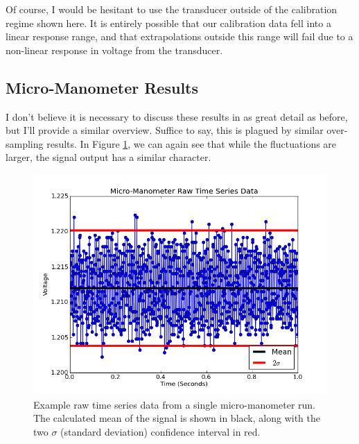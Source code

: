\documentclass{article}
\begin{document}
Of course, I would be hesitant to use the transducer outside of the
calibration regime shown here. It is entirely possible that our
calibration data fell into a linear response range, and that
extrapolations outside this range will fail due to a non-linear response
in voltage from the transducer.


\subsection*{Micro-Manometer Results}

I don't believe it is necessary to discuss these results in as great
detail as before, but I'll provide a similar overview. Suffice to say,
this is plagued by similar over-sampling results. In Figure
\ref{micro-time}, we can again see that while the fluctuations are
larger, the signal output has a similar character. 

  \begin{figure}[!htb]
   \begin{center}
    \includegraphics[width = 12 cm]{figs/micro_time.png}
    \caption{Example raw time series data from a single micro-manometer
    run. The calculated mean of the signal is shown in black, along with
    the two $\sigma$ (standard deviation) confidence interval in
    red.}
    \label{micro-time}
   \end{center}
  \end{figure}
\end{document}
